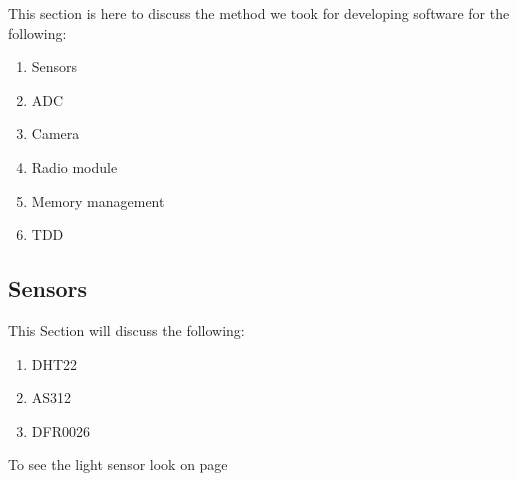 This section is here to discuss the method we took  for  developing software  for the  following:
\begin{enumerate}
    \item Sensors 
    \item ADC
    \item Camera
    \item Radio module
    \item Memory management
    \item TDD
\end{enumerate}
\subsection{Sensors}
This Section will discuss the following:
\begin{enumerate}
    \item DHT22
    \item AS312
    \item DFR0026
\end{enumerate}
To see the light sensor look on page \pageref{ADC section} 
